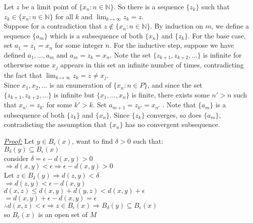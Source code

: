 \documentclass{book}
\begin{document}
\begin{tcolorbox}
\end{tcolorbox}


\begin{tcolorbox}[enhanced,attach boxed title to top center={yshift=-3mm,yshifttext=-1mm},
colback=blue!5!white,colframe=blue!75!black,colbacktitle=red!80!black,
title={Exercise 38.14:},fonttitle=\bfseries,
boxed title style={size=small,colframe=red!50!black} ]
Let $z$ be a limit point of $\{x_n: n\in\mathbb{N}\}$. So there is a sequence $\{z_k\}$ 
such that $z_k\in \{x_n:n\in\mathbb{N}\}$ for all $k$ and 
$\lim_{k\mapsto\infty} z_k=z$.\\
Suppose for a contradiction that $z\notin\{x_n:n\in\mathbb{N}\}$. By induction on $m$, we 
define a sequence $\{a_m\}$ which is a subsequence of both $\{x_n\}$ and 
$\{z_k\}$. For the base case, set $a_1=z_1=x_n$ for some integer $n$. For the 
inductive step, suppose we have defined $a_1,..., a_m$ and $a_m=z_k=x_n$. Note the
set $\{z_{k+1}, z_{k+2},...\}$ is infinite for otherwise some $x_j$ appears in 
this set an infinite number of times, contradicting the fact that 
$\lim_{k\mapsto\infty} z_k=z\neq x_j$.\\
Since $x_1, x_2,...$ is an enumeration of $\{x_n: n\in P\}$,
and since the set $\{z_{k+1}, z_{k+2},...\}$ is infinite but $\{x_1,..., x_n\}$ is
finite, there exists some $n'> n$ such
that $x_{n'}=z_{k'}$ for some $k'>k$. Set $a_{m+1}=z_{k'}=x_{n'}$ . Note that 
$\{a_m\}$ is a subsequence of both $\{z_k\}$ and $\{x_n\}$. Since $\{z_k\}$ 
converges, so does $\{a_m\}$, contradicting the assumption that $\{x_n\}$ has no
convergent subsequence.

\end{tcolorbox}


\begin{tcolorbox}[enhanced,attach boxed title to top center={yshift=-3mm,yshifttext=-1mm},
colback=blue!5!white,colframe=blue!75!black,colbacktitle=red!80!black,
title=Prove that $B_\epsilon (x)$is open set:,fonttitle=\bfseries,
boxed title style={size=small,colframe=red!50!black} ]
\textit{\color{blue}\underline{Proof:}}
Let $y\in B_\epsilon (x)$, want to find $\delta >0$ such that:\\
$B_\delta (y)\subseteq B_\epsilon (x)$\\
consider $\delta=\epsilon-d(x,y)>0$\\
$\Rightarrow d(x,y)<\epsilon\Rightarrow \epsilon-d(x,y)>0$\\
Let $z\in B_\delta (y)\Rightarrow d(z,y)<\delta$\\
$\Rightarrow d(z,y)<\epsilon-d(x,y)$\\
$d(x,z)\leq d(x,y)+d(y,z)<d(x,y)+\epsilon$\\
$=d(x,y)+\epsilon-d(x,y)=\epsilon$\\
$\therefore d(x,z)<\epsilon\Rightarrow z\in B_\epsilon (x)\Rightarrow B_\delta (y) \subseteq B_\epsilon 
(x)$\\
so $B_\epsilon (x)$ is an open set of $M$

\end{tcolorbox}
\end{document}
